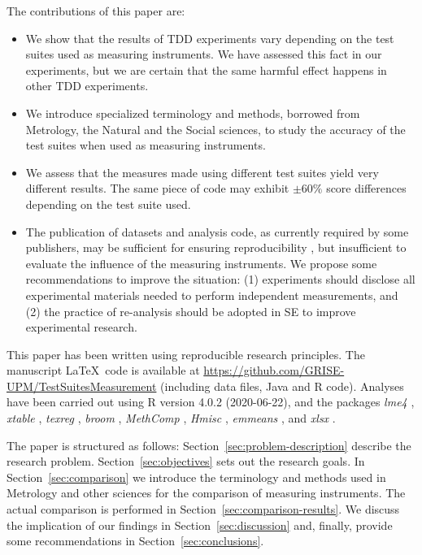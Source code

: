 The contributions of this paper are:
\begin{itemize}

\item We show that the results of TDD experiments vary depending on the test suites used as measuring instruments. We have assessed this fact in our experiments, but we are certain that the same harmful effect happens in other TDD experiments.

\item We introduce specialized terminology and methods, borrowed from Metrology, the Natural and the Social sciences, to study the accuracy of the test suites when used as measuring instruments.

\item We assess that the measures made using different test suites yield very different results. The same piece of code may exhibit $\pm 60\%$ score differences depending on the test suite used.

\item The publication of datasets and analysis code, as currently required by some publishers, may be sufficient for ensuring reproducibility \cite{NAP25303,fernandez2019open}, but insufficient to evaluate the influence of the measuring instruments. We propose some recommendations to improve the situation: (1) experiments should disclose all experimental materials needed to perform independent measurements, and (2) the practice of re-analysis \cite{mittelstaedt1984econometric,IJzendoorn1994} should be adopted in SE to improve experimental research. 

\end{itemize}

This paper has been written using reproducible research principles. The manuscript \LaTeX~code  is available at \url{https://github.com/GRISE-UPM/TestSuitesMeasurement} (including data files, Java and R code). Analyses have been carried out using R \cite{R} version 4.0.2 (2020-06-22), and the packages \textit{lme4} \cite{lme4}, \textit{xtable} \cite{xtable}, \textit{texreg} \cite{texreg}, \textit{broom} \cite{broom}, \textit{MethComp} \cite{MethComp}, \textit{Hmisc} \cite{Hmisc}, \textit{emmeans} \cite{emmeans}, and \textit{xlsx} \cite{xlsx}.

The paper is structured as follows: Section~\ref{sec:problem-description} describe the research problem. Section~\ref{sec:objectives} sets out the research goals. In Section~\ref{sec:comparison} we introduce the terminology and methods used in Metrology and other sciences for the comparison of measuring instruments. The actual comparison is performed in Section~\ref{sec:comparison-results}. We discuss the implication of our findings in Section~\ref{sec:discussion} and, finally, provide some recommendations in Section~\ref{sec:conclusions}.
